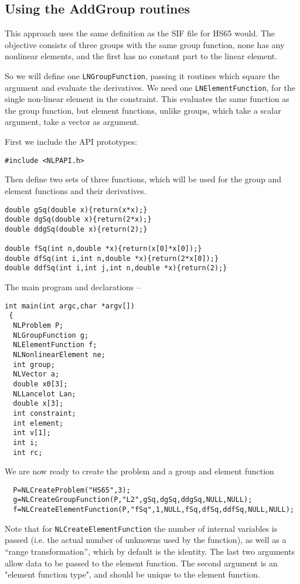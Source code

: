 \documentclass[12pt]{article}
\begin{document}
  \subsection{Using the AddGroup routines}

  This approach uses the same definition as the SIF file for HS65 would.
  The objective consists of three groups with the same group function, 
  none has any nonlinear elements, and the first has no constant part
  to the linear element.

   So we will define one {\tt LNGroup\-Function}, passing it routines which
  square the argument and evaluate the derivatives. We need one 
   {\tt LNElement\-Function}, for the single non-linear element in 
  the constraint. This evaluates the same function as the group function,
  but element functions, unlike groups, which take a scalar argument, take a 
  vector as argument.

  First we include the API prototypes:
\begin{verbatim}
#include <NLPAPI.h>
\end{verbatim}
  Then define two sets of three functions, which will be used for the
  group and element functions and their derivatives.
\begin{verbatim}
double gSq(double x){return(x*x);}
double dgSq(double x){return(2*x);}
double ddgSq(double x){return(2);}

double fSq(int n,double *x){return(x[0]*x[0]);}
double dfSq(int i,int n,double *x){return(2*x[0]);}
double ddfSq(int i,int j,int n,double *x){return(2);}
\end{verbatim}
  The main program and declarations --
\begin{verbatim}
int main(int argc,char *argv[])
 {
  NLProblem P;
  NLGroupFunction g;
  NLElementFunction f;
  NLNonlinearElement ne;
  int group;
  NLVector a;
  double x0[3];
  NLLancelot Lan;
  double x[3];
  int constraint;
  int element;
  int v[1];
  int i;
  int rc;
\end{verbatim}
  We are now ready to create the problem and a group and element function
\begin{verbatim}
  P=NLCreateProblem("HS65",3);
  g=NLCreateGroupFunction(P,"L2",gSq,dgSq,ddgSq,NULL,NULL);
  f=NLCreateElementFunction(P,"fSq",1,NULL,fSq,dfSq,ddfSq,NULL,NULL);

\end{verbatim}
  Note that for {\tt NLCreateElementFunction} the number of internal 
  variables is passed (i.e. the actual number of unknowns used by the
  function), as well as a ``range transformation'', which by default is
  the identity. The last two arguments allow data to be passed to the 
  element function. The second argument is an "element function type",
  and should be unique to the element function.
\end{document}

